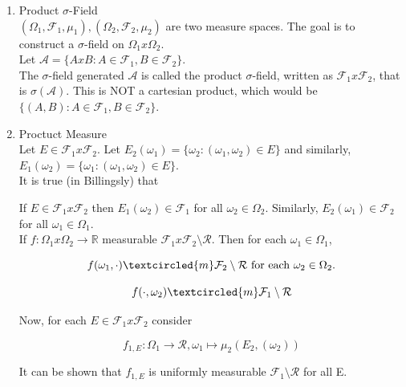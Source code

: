 \documentclass[11pt,fleqn]{book} %
\begin{document}
\begin{enumerate}
	\item Product $\sigma$-Field\\

			$(\Omega_1, \mathcal{F}_1, \mu_1), (\Omega_2, \mathcal{F}_2, \mu_2)$ are two measure spaces. The goal is to construct a $\sigma$-field on $\Omega_1x\Omega_2$. \\

			Let $\mathcal{A} = \{AxB: A \in \mathcal{F}_1, B \in \mathcal{F}_2\}$. \\

			The $\sigma$-field generated $\mathcal{A}$ is called the product $\sigma$-field, written as $\mathcal{F}_1 x \mathcal{F}_2$, that is $\sigma(\mathcal{A})$. This is NOT a cartesian product, which would be $\{(A, B): A\in \mathcal{F}_1, B \in \mathcal{F}_2\}$. 

	\item Proctuct Measure\\

			Let $E \in \mathcal{F}_1 x \mathcal{F}_2$. Let $E_2(\omega_1) = \{\omega_2:(\omega_1, \omega_2) \in E\}$  and similarly, $E_1(\omega_2) = \{\omega_1:(\omega_1, \omega_2) \in E\}$. \\

			It is true (in Billingsly) that 

			\begin{theorem}
				If $E \in \mathcal{F}_1 x \mathcal{F}_2$ then $E_1(\omega_2) \in \mathcal{F}_1$ for all $\omega_2 \in \Omega_2$. Similarly, $E_2(\omega_1) \in \mathcal{F}_2$ for all $\omega_1 \in \Omega_1$. \\


				If $f: \Omega_1 x \Omega_2 \rightarrow \mathbb{R}$ measurable $\mathcal{F}_1 x \mathcal{F}_2 \setminus \mathcal{R}$. Then for each $\omega_1 \in \Omega_1$, 

						$$ f(\omega_1, \cdot) \textcircled{m} \mathcal{F}_2 \setminus \mathcal{R} \text{ for each } \omega_2 \in \Omega_2. $$

						$$ f(\cdot, \omega_2) \textcircled{m} \mathcal{F}_1 \setminus \mathcal{R} $$

				Now, for each $E \in \mathcal{F}_1 x \mathcal{F}_2$ consider 

						$$f_{1, E}: \Omega_1 \rightarrow \mathcal{R}, \omega_1 \mapsto \mu_2(E_2,(\omega_2)) $$

				It can be shown that $f_{1, E}$ is uniformly measurable $\mathcal{F}_1 \setminus \mathcal{R}$ for all E. 



\end{theorem}
\end{enumerate}
\end{document}
